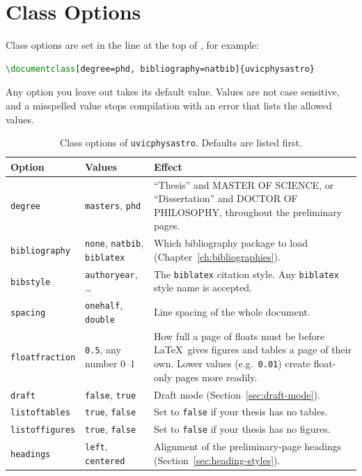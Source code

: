 \section{Class Options}
\label{sec:class-options}

Class options are set in the  line at the top of , for example:
\begin{lstlisting}[language=TeX]
\documentclass[degree=phd, bibliography=natbib]{uvicphysastro}
\end{lstlisting}
Any option you leave out takes its default value. Values are not case sensitive, and a misspelled value stops compilation with an error that lists the allowed values.

\begin{table}[htbp]
    \centering
    \caption{Class options of \texttt{uvicphysastro}. Defaults are listed first.}
    \label{tab:class-options}
    \begin{tabularx}{\linewidth}{@{}l l X@{}}
        \toprule
        Option & Values & Effect \\
        \midrule
        \texttt{degree} & \texttt{masters}, \texttt{phd} & ``Thesis'' and MASTER OF SCIENCE, or ``Dissertation'' and DOCTOR OF PHILOSOPHY, throughout the preliminary pages. \\
        \texttt{bibliography} & \texttt{none}, \texttt{natbib}, \texttt{biblatex} & Which bibliography package to load (Chapter~\ref{ch:bibliographies}). \\
        \texttt{bibstyle} & \texttt{authoryear}, \ldots & The \texttt{biblatex} citation style. Any \texttt{biblatex} style name is accepted. \\
        \texttt{spacing} & \texttt{onehalf}, \texttt{double} & Line spacing of the whole document. \\
        \texttt{floatfraction} & \texttt{0.5}, any number 0--1 & How full a page of floats must be before \LaTeX\ gives figures and tables a page of their own. Lower values (e.g.\ \texttt{0.01}) create float-only pages more readily. \\
        \texttt{draft} & \texttt{false}, \texttt{true} & Draft mode (Section~\ref{sec:draft-mode}). \\
        \texttt{listoftables} & \texttt{true}, \texttt{false} & Set to \texttt{false} if your thesis has no tables. \\
        \texttt{listoffigures} & \texttt{true}, \texttt{false} & Set to \texttt{false} if your thesis has no figures. \\
        \texttt{headings} & \texttt{left}, \texttt{centered} & Alignment of the preliminary-page headings (Section~\ref{sec:heading-styles}). \\
        \bottomrule
    \end{tabularx}
\end{table}

